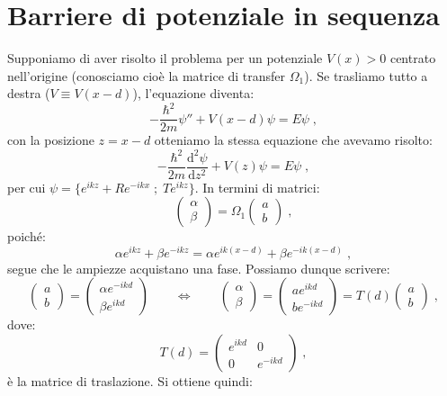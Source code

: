 \documentclass[10pt,a4paper]{report}
\theoremstyle{definition}
\newcommand{\dev}[3][]{\frac{\mathrm{d}^{#1} #2}{\mathrm{d} #3^{#1}}}
\numberwithin{equation}{section}
\begin{document}
\section{Barriere di potenziale in sequenza}
Supponiamo di aver risolto il problema per un potenziale $V(x)>0$ centrato nell'origine (conosciamo cioè la matrice di transfer $\Omega_1$). Se trasliamo tutto a destra ($V\equiv V(x-d)$), l'equazione diventa:
\begin{equation}
-\frac{\hbar^2}{2m}\psi''+V(x-d)\psi=E\psi\;,
\end{equation}
con la posizione $z=x-d$ otteniamo la stessa equazione che avevamo risolto:
$$
-\frac{\hbar^2}{2m}\dev[2]{\psi}{z}+V(z)\psi=E\psi\;,
$$
per cui $\psi=\{e^{ikz}+Re^{-ikx}\; ;\; Te^{ikz}\}$. In termini di matrici:
$$
\left(\begin{matrix}
\alpha \\
\beta
\end{matrix}\right)=\Omega_1\left(
\begin{matrix}
a \\
b
\end{matrix}\right)\;,
$$
poiché:
$$
\alpha e^{ikz}+\beta e^{-ikz}=\alpha e^{ik(x-d)}+\beta e^{-ik(x-d)}\;,
$$
segue che le ampiezze acquistano una fase. Possiamo dunque scrivere:
$$
\left(\begin{matrix}
a \\
b
\end{matrix}\right)=\left(
\begin{matrix}
\alpha e^{-ikd} \\
\beta e^{ikd}
\end{matrix}\right)\qquad \Longleftrightarrow \qquad \left(
\begin{matrix}
\alpha \\
\beta
\end{matrix}\right)=\left(
\begin{matrix}
a e^{ikd} \\
b e^{-ikd}
\end{matrix}\right)=T(d)\left(
\begin{matrix}
a \\
b
\end{matrix}\right)\;,
$$
dove:
\begin{equation}
T(d)=\left(
\begin{matrix}
e^{ikd} & 0 \\
0 & e^{-ikd}
\end{matrix}\right)\;,
\end{equation}
è la matrice di traslazione. Si ottiene quindi:
\end{document}
